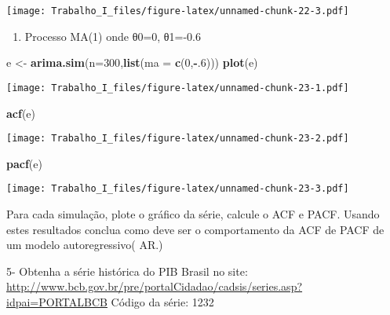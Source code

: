 \documentclass[]{article}
\newenvironment{Shaded}{\begin{snugshade}}{\end{snugshade}}
\newcommand{\KeywordTok}[1]{\textcolor[rgb]{0.13,0.29,0.53}{\textbf{#1}}}
\newcommand{\DataTypeTok}[1]{\textcolor[rgb]{0.13,0.29,0.53}{#1}}
\newcommand{\DecValTok}[1]{\textcolor[rgb]{0.00,0.00,0.81}{#1}}
\newcommand{\StringTok}[1]{\textcolor[rgb]{0.31,0.60,0.02}{#1}}
\newcommand{\CommentTok}[1]{\textcolor[rgb]{0.56,0.35,0.01}{\textit{#1}}}
\newcommand{\OperatorTok}[1]{\textcolor[rgb]{0.81,0.36,0.00}{\textbf{#1}}}
\newcommand{\NormalTok}[1]{#1}
\providecommand{\tightlist}{%
  \setlength{\itemsep}{0pt}\setlength{\parskip}{0pt}}
\begin{document}
\texttt{[image: Trabalho\_I\_files/figure-latex/unnamed-chunk-22-3.pdf]}

\begin{enumerate}
\def\labelenumi{\alph{enumi})}
\setcounter{enumi}{4}
\tightlist
\item
  Processo MA(1) onde θ0=0, θ1=-0.6
\end{enumerate}

\begin{Shaded}
\begin{Highlighting}[]
\NormalTok{e <-}\StringTok{ }\KeywordTok{arima.sim}\NormalTok{(}\DataTypeTok{n=}\DecValTok{300}\NormalTok{,}\KeywordTok{list}\NormalTok{(}\DataTypeTok{ma =} \KeywordTok{c}\NormalTok{(}\DecValTok{0}\NormalTok{,}\OperatorTok{-}\NormalTok{.}\DecValTok{6}\NormalTok{)))}
\KeywordTok{plot}\NormalTok{(e)}
\end{Highlighting}
\end{Shaded}

\texttt{[image: Trabalho\_I\_files/figure-latex/unnamed-chunk-23-1.pdf]}

\begin{Shaded}
\begin{Highlighting}[]
\KeywordTok{acf}\NormalTok{(e)}
\end{Highlighting}
\end{Shaded}

\texttt{[image: Trabalho\_I\_files/figure-latex/unnamed-chunk-23-2.pdf]}

\begin{Shaded}
\begin{Highlighting}[]
\KeywordTok{pacf}\NormalTok{(e)}
\end{Highlighting}
\end{Shaded}

\texttt{[image: Trabalho\_I\_files/figure-latex/unnamed-chunk-23-3.pdf]}

Para cada simulação, plote o gráfico da série, calcule o ACF e PACF.
Usando estes resultados conclua como deve ser o comportamento da ACF de
PACF de um modelo autoregressivo( AR.)

5- Obtenha a série histórica do PIB Brasil no site:
\url{http://www.bcb.gov.br/pre/portalCidadao/cadsis/series.asp?idpai=PORTALBCB}
Código da série: 1232

\begin{Shaded}
\end{Shaded}
\end{document}
